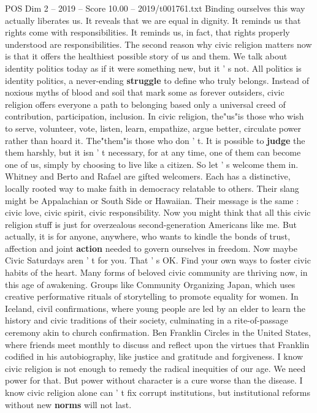 \begin{textsample}{POS Dim 2 – 2019 – Score 10.00 – 2019/t001761.txt}
Binding ourselves this way actually liberates us.
It reveals that we are equal in dignity.
It reminds us that rights come with responsibilities.
It reminds us, in fact, that rights properly understood are responsibilities.
The second reason why civic religion matters now is that it offers the healthiest possible story of us and them.
We talk about identity politics today as if it were something new, but it ' s not.
All politics is identity politics, a never-ending \textbf{struggle} to define who truly belongs.
Instead of noxious myths of blood and soil that mark some as forever outsiders, civic religion offers everyone a path to belonging based only a universal creed of contribution, participation, inclusion.
In civic religion, the"us"is those who wish to serve, volunteer, vote, listen, learn, empathize, argue better, circulate power rather than hoard it.
The"them"is those who don ' t.
It is possible to \textbf{judge} the them harshly, but it isn ' t necessary, for at any time, one of them can become one of us, simply by choosing to live like a citizen.
So let ' s welcome them in.
Whitney and Berto and Rafael are gifted welcomers.
Each has a distinctive, locally rooted way to make faith in democracy relatable to others.
Their slang might be Appalachian or South Side or Hawaiian.
Their message is the same : civic love, civic spirit, civic responsibility.
Now you might think that all this civic religion stuff is just for overzealous second-generation Americans like me.
But actually, it is for anyone, anywhere, who wants to kindle the bonds of trust, affection and joint \textbf{action} needed to govern ourselves in freedom.
Now maybe Civic Saturdays aren ' t for you.
That ' s OK.
Find your own ways to foster civic habits of the heart.
Many forms of beloved civic community are thriving now, in this age of awakening.
Groups like Community Organizing Japan, which uses creative performative rituals of storytelling to promote equality for women.
In Iceland, civil confirmations, where young people are led by an elder to learn the history and civic traditions of their society, culminating in a rite-of-passage ceremony akin to church confirmation.
Ben Franklin Circles in the United States, where friends meet monthly to discuss and reflect upon the virtues that Franklin codified in his autobiography, like justice and gratitude and forgiveness.
I know civic religion is not enough to remedy the radical inequities of our age.
We need power for that.
But power without character is a cure worse than the disease.
I know civic religion alone can ' t fix corrupt institutions, but institutional reforms without new \textbf{norms} will not last.

\end{textsample}
